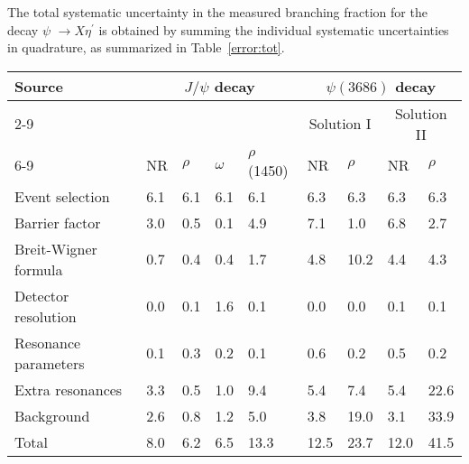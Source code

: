 \documentclass[twocolumn,showpacs,aps,prd]{revtex4-1}
\newcommand{\psip}{\psi(3686)}
\begin{document}
The total systematic uncertainty in the measured branching fraction for the decay $\psi$ $\to X\eta^\prime$ is obtained by summing the individual systematic uncertainties in quadrature, as summarized in Table~\ref{error:tot}.
%
\begin{table*}
  \begin{center}
  \caption{Relative systematic uncertainties for the branching fraction measurement of the decay $\psi \to X\eta^\prime$
  (in percent).}
  \label{error:tot}
  \setlength{\extrarowheight}{1.0ex}
  \renewcommand{\arraystretch}{1.0}
  \vspace{0.2cm}
  \begin{tabular}{p{4.0cm}|m{1.4cm}<{\centering}m{1.4cm}<{\centering}m{1.4cm}<{\centering}m{1.4cm}<{\centering}|m{1.4cm}<{\centering}m{1.4cm}<{\centering}|m{1.4cm}<{\centering}m{1.0cm}<{\centering}}
  \hline\hline
  \multirow{3}{*}{Source} &\multicolumn{4}{c|}{$J/\psi$ decay}          &\multicolumn{4}{c}{$\psip$ decay}  \\ \cline{2-9}
  &  \multicolumn{4}{l|}{}   &\multicolumn{2}{c}{Solution I}  &\multicolumn{2}{c}{Solution II}  \\ \cline{6-9}
                       &NR  &$\rho$ &$\omega$ &$\rho$(1450)  &NR &$\rho$ &NR &$\rho$ \\ \hline
  Event selection      &6.1  &6.1  &6.1  &6.1     &6.3  &6.3  &6.3  &6.3  \\
  Barrier factor       &3.0  &0.5  &0.1  &4.9     &7.1  &1.0  &6.8  &2.7  \\
  Breit-Wigner formula &0.7  &0.4  &0.4  &1.7     &4.8  &10.2 &4.4  &4.3  \\
  Detector resolution  &0.0  &0.1  &1.6  &0.1     &0.0  &0.0  &0.1  &0.1  \\
  Resonance parameters &0.1  &0.3  &0.2  &0.1     &0.6  &0.2  &0.5  &0.2  \\
  Extra resonances     &3.3  &0.5  &1.0  &9.4     &5.4  &7.4  &5.4  &22.6 \\
  Background           &2.6  &0.8  &1.2  &5.0     &3.8  &19.0 &3.1  &33.9  \\

  \hline
  Total                &8.0  &6.2  &6.5  &13.3    &12.5 &23.7 &12.0 &41.5  \\
  \hline\hline
  \end{tabular}
  \vspace{0.2cm}
  \end{center}
\end{table*}
%
\end{document}

